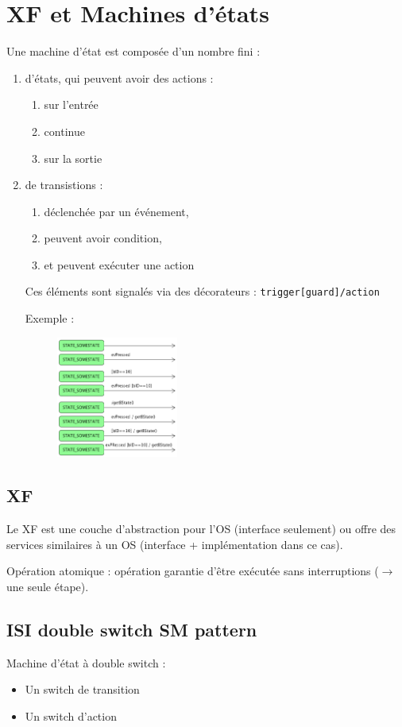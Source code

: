 \section{XF et Machines d'états}
Une machine d'état est composée d'un nombre fini :
\begin{enumerate}
    \item d'états, qui peuvent avoir des actions :
    \begin{enumerate}
        \item sur l'entrée
        \item continue
        \item sur la sortie
    \end{enumerate}
    \item de transistions :
    \begin{enumerate}
        \item déclenchée par un événement,
        \item peuvent avoir condition,
        \item et peuvent exécuter une action
    \end{enumerate}
    Ces éléments sont signalés via des décorateurs : \verb+trigger[guard]/action+
    
    Exemple :
    \begin{figure}[H]
    \centering
        \includegraphics[width=4.00cm]{figures/state_trans.png}
\end{figure}
\end{enumerate}
\subsection{XF}
Le XF est une couche d'abstraction pour l'OS (interface seulement) ou offre des services similaires à un OS (interface + implémentation dans ce cas).

Opération atomique : opération garantie d'être exécutée sans interruptions ($\rightarrow$ une seule étape).

\subsection{ISI double switch SM pattern}
Machine d'état à double switch :
\begin{itemize}
    \item Un switch de transition
    \item Un switch d'action
\end{itemize}